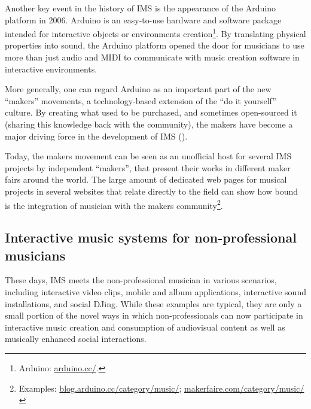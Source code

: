 \documentclass[a4paper,11pt]{article}
\begin{document}
Another key event in the history of IMS is the appearance of the Arduino platform in 2006.
Arduino is an easy-to-use hardware and software package intended for interactive objects or environments creation\footnote{Arduino: \href{http://arduino.cc/}{arduino.cc/}.}.
By translating physical properties into sound, the Arduino platform opened the door for musicians to use more than just audio and MIDI to communicate with music creation software in interactive environments.

More generally, one can regard Arduino as an important part of the new ``makers'' movements, a technology-based extension of the ``do it yourself'' culture.
By creating what used to be purchased, and sometimes open-sourced it (sharing this knowledge back with the community), the makers have become a major driving force in the development of IMS (\cite{web:kirn12}).

Today, the makers movement can be seen as an unofficial host for several IMS projects by independent ``makers'', that present their works in different maker fairs around the world.
The large amount of dedicated web pages for musical projects in several websites that relate directly to the field can show how bound is the integration of musician with the makers community\footnote{Examples: \href{http://blog.arduino.cc/category/music/}{blog.arduino.cc/category/music/}; \href{http://makerfaire.com/category/music/}{makerfaire.com/category/music/}}.

\subsection{Interactive music systems for non-professional musicians} \label{literature:non_pro_ims}

These days, IMS meets the non-professional musician in various scenarios, including interactive video clips, mobile and album applications, interactive sound installations, and social DJing.
While these examples are typical, they are only a small portion of the novel ways in which non-professionals can now participate in interactive music creation and consumption of audiovisual content as well as musically enhanced social interactions.
\end{document}
